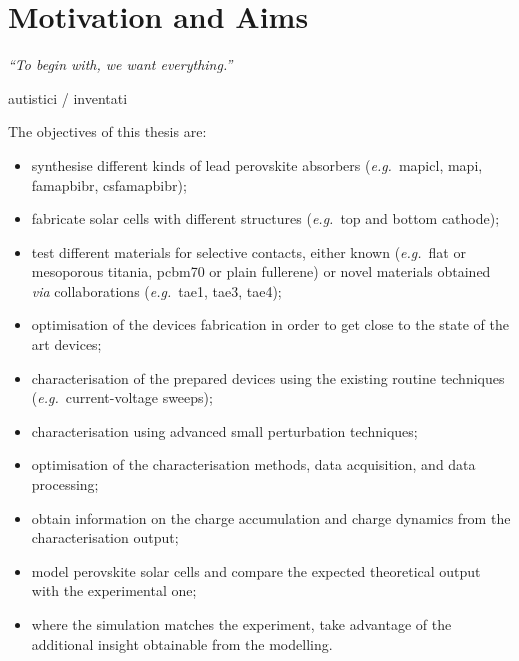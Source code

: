 %
%
%
%

\newpage

\section{Motivation and Aims}\label{sec:aims}
\epigraph{\textit{\enquote{To begin with, we want everything.}}}{autistici / inventati}


The objectives of this thesis are:\nolinebreak
\begin{itemize}
	\item synthesise different kinds of lead perovskite absorbers (\textsl{e.g.}\ \gls{mapicl}, \gls{mapi}, \gls{famapbibr}, \gls{csfamapbibr});
	\item fabricate solar cells with different structures (\textsl{e.g.}\ top and bottom cathode);
	\item test different materials for selective contacts, either known (\textsl{e.g.}\ flat or mesoporous titania, \gls{pcbm70} or plain fullerene) or novel materials obtained \textsl{via} collaborations (\textsl{e.g.}\ \gls{tae1}, \gls{tae3}, \gls{tae4});
	\item optimisation of the devices fabrication in order to get close to the state of the art devices;
	\item characterisation of the prepared devices using the existing routine techniques (\textsl{e.g.}\ current\hyp{}voltage sweeps);
	\item characterisation using advanced small perturbation techniques;
	\item optimisation of the characterisation methods, data acquisition, and data processing;
	\item obtain information on the charge accumulation and charge dynamics from the characterisation output;
	\item model perovskite solar cells and compare the expected theoretical output with the experimental one;
	\item where the simulation matches the experiment, take advantage of the additional insight obtainable from the modelling.	
\end{itemize} 

